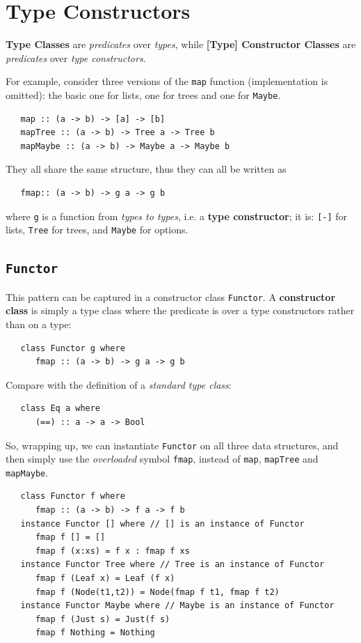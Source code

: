 \section{Type Constructors}
\textbf{Type Classes} are \textit{predicates} over \textit{types},
while \textbf{[Type] Constructor Classes} are \textit{predicates} over \textit{type constructors}.

For example, consider three versions of the \lstinline|map| function (implementation is omitted): the basic one for lists, one for trees and one for \lstinline|Maybe|.
\begin{lstlisting}
   map :: (a -> b) -> [a] -> [b]
   mapTree :: (a -> b) -> Tree a -> Tree b
   mapMaybe :: (a -> b) -> Maybe a -> Maybe b
\end{lstlisting}
They all share the same structure, thus they can all be written as
\begin{lstlisting}
   fmap:: (a -> b) -> g a -> g b
\end{lstlisting}
where \lstinline|g| is a function from \textit{types to types}, i.e.
a \textbf{type constructor};
it is:
\lstinline|[-]| for lists, \lstinline|Tree| for trees, and \lstinline|Maybe| for options.

\subsection{\texttt{Functor}}
This pattern can be captured in a constructor
class \lstinline|Functor|. 
A \textbf{constructor class} is simply a type class where
the predicate is over a type constructors rather
than on a type:
\begin{lstlisting}
   class Functor g where
      fmap :: (a -> b) -> g a -> g b
\end{lstlisting}

Compare with the definition of a \textit{standard type class}:
\begin{lstlisting}
   class Eq a where
      (==) :: a -> a -> Bool
\end{lstlisting}

So, wrapping up, we can instantiate \lstinline|Functor| on all three data structures,
and then simply use the \textit{overloaded} symbol \lstinline|fmap|, instead of \lstinline|map|, \lstinline|mapTree| and \lstinline|mapMaybe|.
\begin{lstlisting}
   class Functor f where
      fmap :: (a -> b) -> f a -> f b
   instance Functor [] where // [] is an instance of Functor
      fmap f [] = []
      fmap f (x:xs) = f x : fmap f xs
   instance Functor Tree where // Tree is an instance of Functor
      fmap f (Leaf x) = Leaf (f x)
      fmap f (Node(t1,t2)) = Node(fmap f t1, fmap f t2)
   instance Functor Maybe where // Maybe is an instance of Functor
      fmap f (Just s) = Just(f s)
      fmap f Nothing = Nothing
\end{lstlisting}

